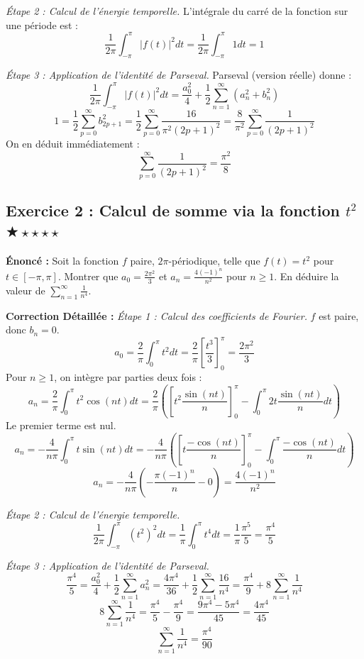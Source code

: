 \documentclass[11pt,a4paper]{article}
\begin{document}
\textit{Étape 2 : Calcul de l'énergie temporelle.}
L'intégrale du carré de la fonction sur une période est :
$$\frac{1}{2\pi} \int_{-\pi}^\pi |f(t)|^2 dt = \frac{1}{2\pi} \int_{-\pi}^\pi 1 dt = 1$$

\textit{Étape 3 : Application de l'identité de Parseval.}
Parseval (version réelle) donne :
$$\frac{1}{2\pi} \int_{-\pi}^\pi |f(t)|^2 dt = \frac{a_0^2}{4} + \frac{1}{2} \sum_{n=1}^\infty (a_n^2 + b_n^2)$$
$$1 = \frac{1}{2} \sum_{p=0}^\infty b_{2p+1}^2 = \frac{1}{2} \sum_{p=0}^\infty \frac{16}{\pi^2(2p+1)^2} = \frac{8}{\pi^2} \sum_{p=0}^\infty \frac{1}{(2p+1)^2}$$
On en déduit immédiatement :
$$\sum_{p=0}^\infty \frac{1}{(2p+1)^2} = \frac{\pi^2}{8}$$

\vspace{1cm}
\subsection*{Exercice 2 : Calcul de somme via la fonction $t^2$ $\bigstar\star\star\star\star$}

\textbf{Énoncé :} Soit la fonction $f$ paire, $2\pi$-périodique, telle que $f(t) = t^2$ pour $t \in [-\pi, \pi]$.
Montrer que $a_0 = \frac{2\pi^2}{3}$ et $a_n = \frac{4(-1)^n}{n^2}$ pour $n \ge 1$.
En déduire la valeur de $\sum_{n=1}^\infty \frac{1}{n^4}$.

\textbf{Correction Détaillée :}
\textit{Étape 1 : Calcul des coefficients de Fourier.}
$f$ est paire, donc $b_n = 0$.
$$a_0 = \frac{2}{\pi} \int_0^\pi t^2 dt = \frac{2}{\pi} \left[ \frac{t^3}{3} \right]_0^\pi = \frac{2\pi^2}{3}$$
Pour $n \ge 1$, on intègre par parties deux fois :
$$a_n = \frac{2}{\pi} \int_0^\pi t^2 \cos(nt) dt = \frac{2}{\pi} \left( \left[ t^2 \frac{\sin(nt)}{n} \right]_0^\pi - \int_0^\pi 2t \frac{\sin(nt)}{n} dt \right)$$
Le premier terme est nul.
$$a_n = -\frac{4}{n\pi} \int_0^\pi t \sin(nt) dt = -\frac{4}{n\pi} \left( \left[ t \frac{-\cos(nt)}{n} \right]_0^\pi - \int_0^\pi \frac{-\cos(nt)}{n} dt \right)$$
$$a_n = -\frac{4}{n\pi} \left( -\frac{\pi (-1)^n}{n} - 0 \right) = \frac{4(-1)^n}{n^2}$$

\textit{Étape 2 : Calcul de l'énergie temporelle.}
$$\frac{1}{2\pi} \int_{-\pi}^\pi (t^2)^2 dt = \frac{1}{\pi} \int_0^\pi t^4 dt = \frac{1}{\pi} \frac{\pi^5}{5} = \frac{\pi^4}{5}$$

\textit{Étape 3 : Application de l'identité de Parseval.}
$$\frac{\pi^4}{5} = \frac{a_0^2}{4} + \frac{1}{2} \sum_{n=1}^\infty a_n^2 = \frac{4\pi^4}{36} + \frac{1}{2} \sum_{n=1}^\infty \frac{16}{n^4} = \frac{\pi^4}{9} + 8 \sum_{n=1}^\infty \frac{1}{n^4}$$
$$8 \sum_{n=1}^\infty \frac{1}{n^4} = \frac{\pi^4}{5} - \frac{\pi^4}{9} = \frac{9\pi^4 - 5\pi^4}{45} = \frac{4\pi^4}{45}$$
$$\sum_{n=1}^\infty \frac{1}{n^4} = \frac{\pi^4}{90}$$
\end{document}
